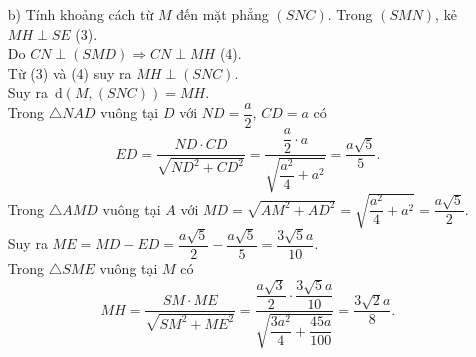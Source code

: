 \begin{bt}
{\begin{itemize}
{
	}
	\item[b)] Tính khoảng cách từ $M$ đến mặt phẳng $(SNC)$.
	Trong $(SMN)$, kẻ $MH \perp SE$ (3).\\
	Do $CN \perp (SMD) \Rightarrow CN \perp MH$ (4).\\
	Từ (3) và (4) suy ra $MH \perp (SNC)$.\\ Suy ra $\mathrm{\,d} (M,(SNC)) = MH$.\\
	Trong $\triangle NAD$ vuông tại $D$ với $ND = \dfrac{a}{2}$, $CD = a$ có 
	\[ED = \dfrac{ND \cdot CD}{\sqrt{ND^2 + CD^2}} = \dfrac{\dfrac{a}{2} \cdot a}{\sqrt{\dfrac{a^2}{4} + a^2}} = \dfrac{a\sqrt{5}}{5}.\]
	Trong $\triangle AMD$ vuông tại $A$ với $MD = \sqrt{AM^2 + AD^2} = \sqrt{\dfrac{a^2}{4} + a^2} = \dfrac{a\sqrt{5}}{2}$.\\
	Suy ra $ME = MD - ED = \dfrac{a\sqrt{5}}{2} - \dfrac{a\sqrt{5}}{5} = \dfrac{3\sqrt{5}a}{10}$.\\
	Trong $\triangle SME$ vuông tại $M$ có
	\[MH = \dfrac{SM \cdot ME}{\sqrt{SM^2 + ME^2}} = \dfrac{\dfrac{a\sqrt{3}}{2} \cdot \dfrac{3\sqrt{5}a}{10}}{\sqrt{\dfrac{3a^2}{4} + \dfrac{45a}{100}}} = \dfrac{3\sqrt{2}a}{8}.\]
	\end{itemize}
	}
\end{bt}
